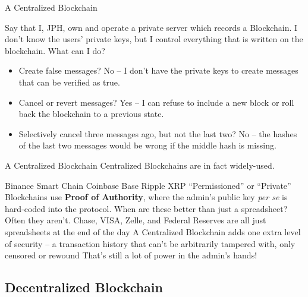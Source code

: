 \documentclass[aspectratio=169]{beamer}
\begin{document}
\begin{frame}{A Centralized Blockchain}

Say that I, JPH, own and operate a private server which records a Blockchain. I don't know the users' private keys, but I control everything that is written on the blockchain. What can I do? \pause 
\begin{itemize}
    \item Create false messages? \pause 
    \bi 
    \m No -- I don't have the private keys to create messages that can be verified as true.  
    \ei 
    \item Cancel or revert messages? 
    \bi 
    \m Yes -- I can refuse to include a new block or roll back the blockchain to a previous state.  
    \ei 
    \item Selectively cancel three messages ago, but not the last two?  
    \bi 
    \m No -- the hashes of the last two messages would be wrong if the middle hash is missing. 
    \ei 
\end{itemize}
    
\end{frame}

\begin{frame}{A Centralized Blockchain}
\small
Centralized Blockchains are in fact widely-used. 

\bi 
\m Binance Smart Chain 
\m Coinbase Base 
\m Ripple XRP 
\m ``Permissioned'' or ``Private'' Blockchains use \textbf{Proof of Authority}, where the admin's public key \emph{per se} is hard-coded into the protocol. 
\ei \pause 
When are these better than just a spreadsheet? \pause \\ 
\bi 
\m Often they aren't. Chase, VISA, Zelle, and Federal Reserves are all just spreadsheets at the end of the day  
\m A Centralized Blockchain adds one extra level of security -- a transaction history that can't be arbitrarily tampered with, only censored or rewound   
\m That's still a lot of power in the admin's hands!
\ei 

\end{frame}


\subsection{Decentralized Blockchain}
\end{document}

